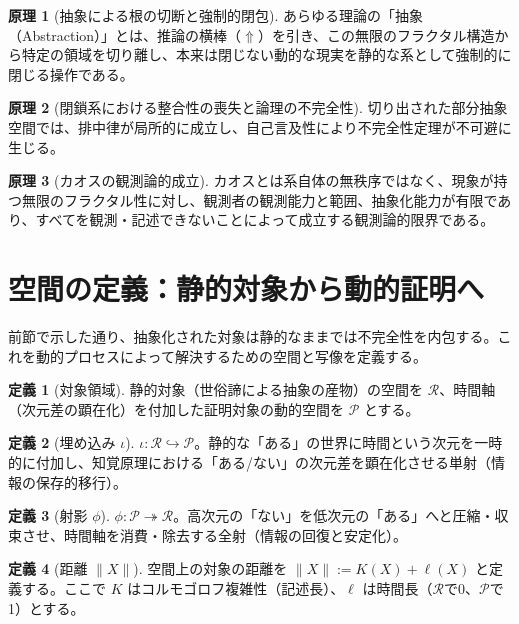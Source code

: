 \documentclass[11pt,a4paper]{article}
\theoremstyle{definition}
\newtheorem{principle}{原理}[section]
\newtheorem{definition}{定義}[section]
\newcommand{\Rep}{\mathcal{R}}   %
\newcommand{\Prf}{\mathcal{P}}   %
\newcommand{\metanegation}{\Uparrow}     %
\begin{document}
\begin{principle}[抽象による根の切断と強制的閉包]
あらゆる理論の「抽象（Abstraction）」とは、推論の横棒（$\metanegation$）を引き、この無限のフラクタル構造から特定の領域を切り離し、本来は閉じない動的な現実を静的な系として強制的に閉じる操作である。
\end{principle}

\begin{principle}[閉鎖系における整合性の喪失と論理の不完全性]
切り出された部分抽象空間では、排中律が局所的に成立し、自己言及性により不完全性定理が不可避に生じる。
\end{principle}

\begin{principle}[カオスの観測論的成立]
カオスとは系自体の無秩序ではなく、現象が持つ無限のフラクタル性に対し、観測者の観測能力と範囲、抽象化能力が有限であり、すべてを観測・記述できないことによって成立する観測論的限界である。
\end{principle}

\section{空間の定義：静的対象から動的証明へ}

前節で示した通り、抽象化された対象は静的なままでは不完全性を内包する。これを動的プロセスによって解決するための空間と写像を定義する。

\begin{definition}[対象領域]
静的対象（世俗諦による抽象の産物）の空間を $\Rep$、時間軸（次元差の顕在化）を付加した証明対象の動的空間を $\Prf$ とする。
\end{definition}

\begin{definition}[埋め込み $\iota$]
$\iota: \Rep \hookrightarrow \Prf$。静的な「ある」の世界に時間という次元を一時的に付加し、知覚原理における「ある/ない」の次元差を顕在化させる単射（情報の保存的移行）。
\end{definition}

\begin{definition}[射影 $\phi$]
$\phi: \Prf \twoheadrightarrow \Rep$。高次元の「ない」を低次元の「ある」へと圧縮・収束させ、時間軸を消費・除去する全射（情報の回復と安定化）。
\end{definition}

\begin{definition}[距離 $\|X\|$]
空間上の対象の距離を $\|X\| := K(X) + \ell(X)$ と定義する。ここで $K$ はコルモゴロフ複雑性（記述長）、$\ell$ は時間長（$\Rep$で0、$\Prf$で1）とする。
\end{definition}
\end{document}
